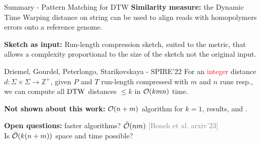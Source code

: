 \begin{frame}{Summary - Pattern Matching for DTW}
    \textbf{Similarity measure:} the Dynamic Time Warping distance on string can be used to align reads with homopolymers errors onto a reference genome.

    \vfill
    
    \textbf{Sketch as input:} Run-length compression sketch, suited to the metric, that allows a complexity proportional to the size of the sketch not the original input.
    
    \vfill
    \begin{myalertblock}{Driemel, Gourdel, Peterlongo, Starikovskaya - SPIRE'22}
        For an \textcolor{red}{integer} distance $d: \Sigma \times \Sigma \rightarrow \mathbb{Z}^+$, given $P$ and $T$ run-length compressed with $m$ and $n$ runs resp.,
        we can compute all $\mathrm{DTW}$ distances $\leq k$ in $\mathcal{O}(k mn)$ time.
    \end{myalertblock}
    \vfill
    \textbf{Not shown about this work:} $\mathcal{O}(n+m)$ algorithm for $k=1$,  results, and .


    \smallskip
    \textbf{Open questions:} faster algorithms? \textcolor{gray}{ $\tilde{\mathcal{O}}(nm)$ [Boneh et al. arxiv'23]}\\ Is $\tilde{\mathcal{O}}(k(n+m))$ space and time possible?
\end{frame}
    